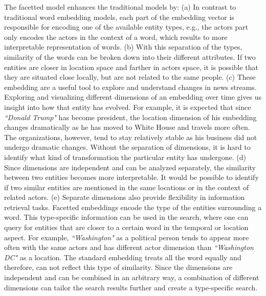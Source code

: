 The facetted model enhances the traditional models by: (a) In contrast to traditional word embedding models, each part of the embedding vector is responsible for encoding one of the available entity types, e.g., the actors part only encodes the actors in the context of a word, which results to more interpretable representation of words. (b) With this separation of the types, similarity of the words can be broken down into their different attributes. If two entities are closer in location space and farther in actors space, it is possible that they are situated close locally, but are not related to the same people. (c) These embedding are a useful tool to explore and understand changes in news streams. Exploring and visualizing different dimensions of an embedding over time  gives us insight into how that entity has evolved. For example, it is expected that since \emph{``Donald Trump"} has become president, the location dimension of his embedding changes dramatically as he has moved to White House and travels more often. The organizations, however, tend to stay relatively stable as his business did not undergo dramatic changes. Without the separation of dimensions, it is hard to identify what kind of transformation the particular entity has undergone. (d) Since dimensions are independent and can be analyzed separately, the similarity between two entities becomes more interpretable. It would be possible to identify if two similar entities are mentioned in the same locations or in the context of related actors. (e) Separate dimensions also provide flexibility in information retrieval tasks. Facetted embeddings encode the type of the entities surrounding a word. This type-specific information can be used in the search, where one can query for entities that are closer to a certain word in the temporal or location aspect. For example, \emph{``Washington"} as a political person tends to appear more often with the same actors and has different actor dimension than \emph{``Washington DC"} as a location. The standard embedding treats all the word equally and therefore, can not reflect this type of similarity. Since the dimensions are independent and can be combined in an arbitrary way, a combination of different dimensions can tailor the search results further and create a type-specific search. 


